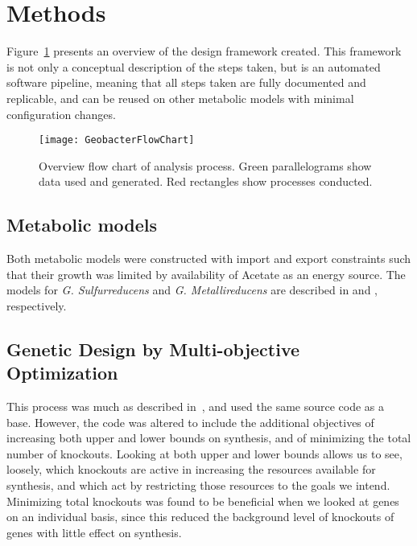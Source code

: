\documentclass[a4paper,twocolumn]{article}
\begin{document}
\section{Methods}

Figure~\ref{fig:flowdiagram} presents an overview of the design framework created. This framework is not only a conceptual description of the steps taken, but is an automated software pipeline, meaning that all steps taken are fully documented and replicable, and can be reused on other metabolic models with minimal configuration changes. 

\begin{figure}[!htb]
\texttt{[image: GeobacterFlowChart]}
\caption{Overview flow chart of analysis process. Green parallelograms show data used and generated. Red rectangles show processes conducted.}
\label{fig:flowdiagram}
\end{figure}

\subsection{Metabolic models}
Both metabolic models were constructed with import and export constraints such that their growth was limited by availability of Acetate as an energy source. The models for {\it G. Sulfurreducens} and {\it G. Metallireducens }are described in \cite{Mahadevan2006} and \cite{Sun2009}, respectively.

\subsection{Genetic Design by Multi-objective Optimization}
This process was much as described in~\cite{Costanza2012}, and used the same source code as a base. However, the code was altered to include the additional objectives of increasing both upper and lower bounds on synthesis, and of minimizing the total number of knockouts. Looking at both upper and lower bounds allows us to see, loosely, which knockouts are active in increasing the resources available for synthesis, and which act by restricting those resources to the goals we intend. Minimizing total knockouts was found to be beneficial when we looked at genes on an individual basis, since this reduced the background level of knockouts of genes with little effect on synthesis.
\end{document}
